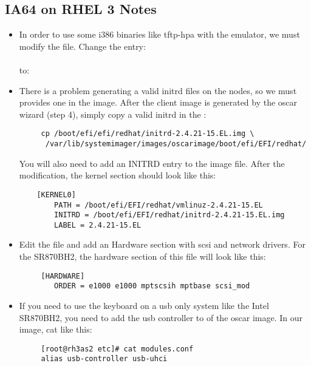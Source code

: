 \subsection{IA64 on RHEL 3 Notes}
\label{subsec:ia64notes}

\begin{itemize}

\item In order to use some i386 binaries like tftp-hpa with the emulator, 
  we must modify the  file. 
  Change the entry: \ \\
     \ \\ 
  to: \ \\

\item There is a problem generating a valid initrd files on the nodes, so we 
  must provides one in the image.  After the client image is generated by the 
  oscar wizard (step 4), simply copy a valid initrd in the 
  :

  \begin{verbatim}
     cp /boot/efi/efi/redhat/initrd-2.4.21-15.EL.img \
      /var/lib/systemimager/images/oscarimage/boot/efi/EFI/redhat/
  \end{verbatim}

  You will also need to add an INITRD entry to the image
   file. After the modification, the 
  kernel section should look like this:

  \begin{verbatim}
    [KERNEL0]
        PATH = /boot/efi/EFI/redhat/vmlinuz-2.4.21-15.EL
        INITRD = /boot/efi/EFI/redhat/initrd-2.4.21-15.EL.img
        LABEL = 2.4.21-15.EL
  \end{verbatim}

\item Edit the file 
  and add an Hardware section with scsi and network drivers. For the SR870BH2,
  the hardware section of this file will look like this:

  \begin{verbatim}
     [HARDWARE]
        ORDER = e1000 e1000 mptscsih mptbase scsi_mod
  \end{verbatim}

\item If you need to use the keyboard on a usb only system like the Intel 
  SR870BH2, you need to add the usb controller to  
  of the oscar image. In our image, \file{/etc/modules.conf} cat like this:

  \begin{verbatim}
     [root@rh3as2 etc]# cat modules.conf
     alias usb-controller usb-uhci
  \end{verbatim}

\end{itemize}

